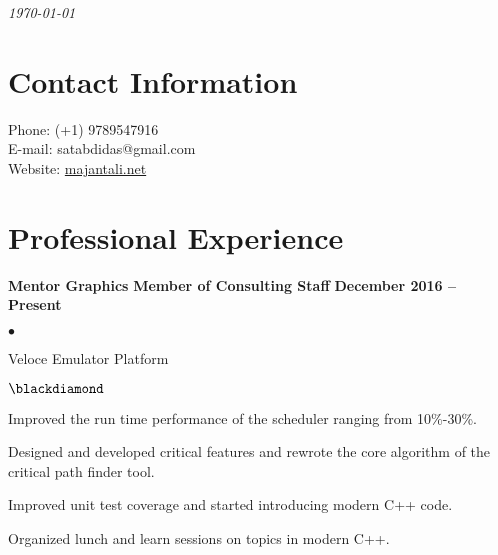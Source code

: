 \documentclass[margin,line]{res}
\newenvironment{list1}{
  \begin{list}{$\bullet$}{%
      \setlength{\itemsep}{0in}
      \setlength{\parsep}{0in} \setlength{\parskip}{0in}
      \setlength{\topsep}{0in} \setlength{\partopsep}{0in}
      \setlength{\leftmargin}{0.17in}}}{\end{list}}
\newenvironment{list2}{
  \begin{list}{$\blackdiamond$}{%
      \setlength{\itemsep}{0in}
      \setlength{\parsep}{0in} \setlength{\parskip}{0in}
      \setlength{\topsep}{0in} \setlength{\partopsep}{0in}
      \setlength{\leftmargin}{0.2in}}}{\end{list}}
\begin{document}
 \hfill {\em \today}

\begin{resume}
\section{\sc Contact Information}

\vspace{.05in}
Phone:  (+1) 9789547916\\
E-mail:  satabdidas@gmail.com\\
Website: \url{majantali.net}



\section{\sc Professional Experience}
{\bf   Mentor Graphics}
\hfill {\bf Member of Consulting Staff}
\hfill{\bf December 2016 -- Present}
\vspace{.05in}
\begin{list1} %
	\item Veloce Emulator Platform
	\begin{list2}
		\item Improved the run time performance of the scheduler ranging from 10\%-30\%.
		\item Designed and developed critical features and rewrote the core algorithm of the critical path finder tool.
		\item Improved unit test coverage and started introducing modern C++ code.
		\item Organized lunch and learn sessions on topics in modern C++.	
	\end{list2}
\end{list1}


\end{resume}
\end{document}
